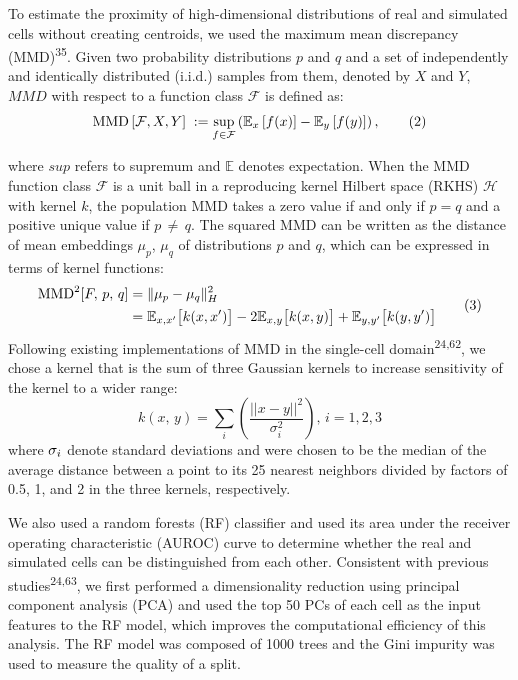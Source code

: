 To estimate the proximity of high-dimensional distributions of real and simulated cells without creating centroids, we used the maximum mean discrepancy (MMD)\textsuperscript{35}. Given two probability distributions $p$ and $q$ and a set of independently and identically distributed (i.i.d.) samples from them, denoted by $X$ and $Y$, $MMD$ with respect to a function class ${{{{\mathcal{F}}}}}$ is defined as:
\begin{equation} 
{{\rm MMD}}\left[ \mathcal{F}, X, Y \right] \; := 
\sup_{f \in \mathcal{F}} 
\left(
\mathbb{E}_x \left[ f(x) \right] - \mathbb{E}_y \left[ f(y) \right]
\right),
\tag{2}\label{eq:groundgan2} 
\end{equation}

where $sup$ refers to supremum and ${\mathbb{E}}$ denotes expectation. When the MMD function class ${{{{\mathcal{F}}}}}$ is a unit ball in a reproducing kernel Hilbert space (RKHS) ${{{{\mathcal{H}}}}}$ with kernel $k$, the population MMD takes a zero value if and only if $p = q$ and a positive unique value if $p \, \ne \, q$. The squared MMD can be written as the distance of mean embeddings ${\mu }_{p}$, ${\mu }_{q}$ of distributions $p$ and $q$, which can be expressed in terms of kernel functions:
\begin{equation} 
\begin{aligned}
{\rm MMD}^{2}[ F, \, p, \, q ] 
&= \| \mu_p - \mu_q \|_H^2 \\
&= \mathbb{E}_{x, x'} \big[ k(x, x') \big] 
   - 2 \mathbb{E}_{x, y} \big[ k(x, y) \big] 
   + \mathbb{E}_{y, y'} \big[ k(y, y') \big]
\end{aligned}
\tag{3}\label{eq:groundgan3}
\end{equation}
Following existing implementations of MMD in the single-cell domain\textsuperscript{24,62}, we chose a kernel that is the sum of three Gaussian kernels to increase sensitivity of the kernel to a wider range:
\begin{equation} 
k\left(x,\, y\right)={\sum}_{i}\left(\frac{{||x}-y{{||}}^{2}}{{\sigma }_{i}^{2}}\right),\, i={{{\mathrm{1,2,3}}}}
\tag{4}\label{eq:groundgan4} 
\end{equation}
where ${{{{{\rm{\sigma }}}}}}_{i}$ denote standard deviations and were chosen to be the median of the average distance between a point to its 25 nearest neighbors divided by factors of 0.5, 1, and 2 in the three kernels, respectively.

We also used a random forests (RF) classifier and used its area under the receiver operating characteristic (AUROC) curve to determine whether the real and simulated cells can be distinguished from each other. Consistent with previous studies\textsuperscript{24,63}, we first performed a dimensionality reduction using principal component analysis (PCA) and used the top 50 PCs of each cell as the input features to the RF model, which improves the computational efficiency of this analysis. The RF model was composed of 1000 trees and the Gini impurity was used to measure the quality of a split.

